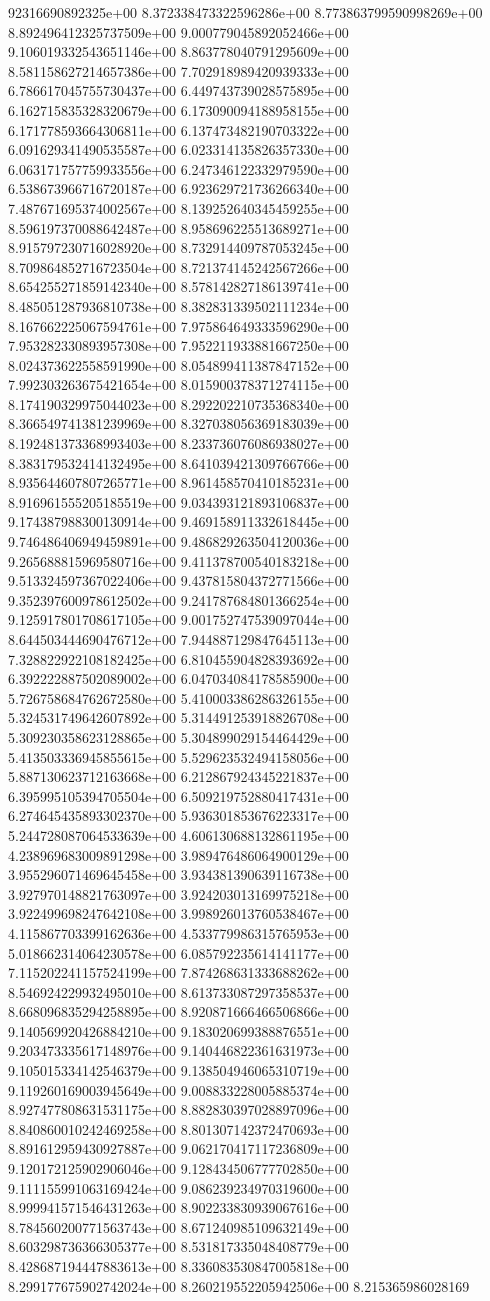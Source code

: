 92316690892325e+00	8.372338473322596286e+00	8.773863799590998269e+00	8.892496412325737509e+00	9.000779045892052466e+00	9.106019332543651146e+00	8.863778040791295609e+00	8.581158627214657386e+00	7.702918989420939333e+00	6.786617045755730437e+00	6.449743739028575895e+00	6.162715835328320679e+00	6.173090094188958155e+00	6.171778593664306811e+00	6.137473482190703322e+00	6.091629341490535587e+00	6.023314135826357330e+00	6.063171757759933556e+00	6.247346122332979590e+00	6.538673966716720187e+00	6.923629721736266340e+00	7.487671695374002567e+00	8.139252640345459255e+00	8.596197370088642487e+00	8.958696225513689271e+00	8.915797230716028920e+00	8.732914409787053245e+00	8.709864852716723504e+00	8.721374145242567266e+00	8.654255271859142340e+00	8.578142827186139741e+00	8.485051287936810738e+00	8.382831339502111234e+00	8.167662225067594761e+00	7.975864649333596290e+00	7.953282330893957308e+00	7.952211933881667250e+00	8.024373622558591990e+00	8.054899411387847152e+00	7.992303263675421654e+00	8.015900378371274115e+00	8.174190329975044023e+00	8.292202210735368340e+00	8.366549741381239969e+00	8.327038056369183039e+00	8.192481373368993403e+00	8.233736076086938027e+00	8.383179532414132495e+00	8.641039421309766766e+00	8.935644607807265771e+00	8.961458570410185231e+00	8.916961555205185519e+00	9.034393121893106837e+00	9.174387988300130914e+00	9.469158911332618445e+00	9.746486406949459891e+00	9.486829263504120036e+00	9.265688815969580716e+00	9.411378700540183218e+00	9.513324597367022406e+00	9.437815804372771566e+00	9.352397600978612502e+00	9.241787684801366254e+00	9.125917801708617105e+00	9.001752747539097044e+00	8.644503444690476712e+00	7.944887129847645113e+00	7.328822922108182425e+00	6.810455904828393692e+00	6.392222887502089002e+00	6.047034084178585900e+00	5.726758684762672580e+00	5.410003386286326155e+00	5.324531749642607892e+00	5.314491253918826708e+00	5.309230358623128865e+00	5.304899029154464429e+00	5.413503336945855615e+00	5.529623532494158056e+00	5.887130623712163668e+00	6.212867924345221837e+00	6.395995105394705504e+00	6.509219752880417431e+00	6.274645435893302370e+00	5.936301853676223317e+00	5.244728087064533639e+00	4.606130688132861195e+00	4.238969683009891298e+00	3.989476486064900129e+00	3.955296071469645458e+00	3.934381390639116738e+00	3.927970148821763097e+00	3.924203013169975218e+00	3.922499698247642108e+00	3.998926013760538467e+00	4.115867703399162636e+00	4.533779986315765953e+00	5.018662314064230578e+00	6.085792235614141177e+00	7.115202241157524199e+00	7.874268631333688262e+00	8.546924229932495010e+00	8.613733087297358537e+00	8.668096835294258895e+00	8.920871666466506866e+00	9.140569920426884210e+00	9.183020699388876551e+00	9.203473335617148976e+00	9.140446822361631973e+00	9.105015334142546379e+00	9.138504946065310719e+00	9.119260169003945649e+00	9.008833228005885374e+00	8.927477808631531175e+00	8.882830397028897096e+00	8.840860010242469258e+00	8.801307142372470693e+00	8.891612959430927887e+00	9.062170417117236809e+00	9.120172125902906046e+00	9.128434506777702850e+00	9.111155991063169424e+00	9.086239234970319600e+00	8.999941571546431263e+00	8.902233830939067616e+00	8.784560200771563743e+00	8.671240985109632149e+00	8.603298736366305377e+00	8.531817335048408779e+00	8.428687194447883613e+00	8.336083530847005818e+00	8.299177675902742024e+00	8.260219552205942506e+00	8.215365986028169